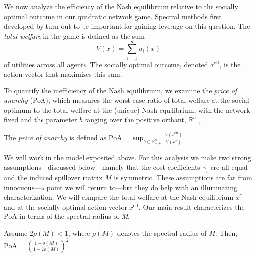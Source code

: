 \documentclass{notices}
\theoremstyle{definition}\newtheorem{problem}{Problem}
\begin{document}
We now analyze the efficiency of the Nash equilibrium relative to the socially optimal outcome in our quadratic network game. Spectral methods first developed by \cite{bindel2015bad} turn out to be important for gaining leverage on this question. The \emph{total welfare} in the game is defined as the sum \begin{equation} V(x) = \sum_{i=1}^n u_i(x) \label{eq:welfare_game} \end{equation} of utilities across all agents.  The socially optimal outcome, denoted $x^{\mathrm{eff}}$, is the action vector that maximizes this sum. 


To quantify the inefficiency of the Nash equilibrium, we examine the \emph{price of anarchy} (PoA), which measures the worst-case ratio of total welfare at the social optimum to the total welfare at the (unique) Nash equilibrium, with the network fixed and the parameter $b$ ranging over the positive orthant, $\mathbb{R}_{++}^n$.


\begin{definition}
The \emph{price of anarchy} is defined as
$
\text{PoA} = \sup_{b \in \mathbb{R}_{++}^n} \frac{V(x^{\mathrm{eff}})}{V(x^*)}.
$
\end{definition}

We will work in the model exposited above. For this analysis we make two strong assumptions---discussed below---namely that the cost coefficients $\gamma_i$ are all equal and the induced spillover matrix $M$ is symmetric. These assumptions are far from innocuous---a point we will return to---but they do help with an illuminating characterization. We will compare the total welfare at the Nash equilibrium $x^*$ and at the socially optimal action vector $x^{\mathrm{eff}}$.
 Our main result characterizes the PoA in terms of the spectral radius of $M$.

\begin{prop}
\label{thm:poa}
Assume $2\rho(M)<1$, where $\rho(M)$ denotes the spectral radius of $M$. Then,
$
\text{PoA} = \left( \frac{1 -  \rho(M)}{1 - 2 \rho(M)} \right)^2.
$
\end{prop}
\end{document}
